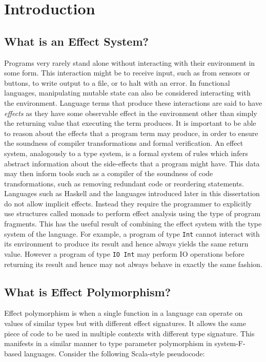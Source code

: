 
\chapter{Introduction}


\section{What is an Effect System?}

Programs very rarely stand alone without interacting with their environment in some form. This interaction might be to receive input, such as from sensors or buttons, to write output to a file, or to halt with an error. In functional languages, manipulating mutable state can also be considered interacting with the environment. Language terms that produce these interactions are said to have \textit{effects} as they have some observable effect in the environment other than simply the returning value that executing the term produces. It is important to be able to reason about the effects that a program term may produce, in order to ensure the soundness of compiler transformations and formal verification. An effect system, analogously to a type system, is a formal system of rules which infers abstract information about the side-effects that a program might have. This data may then inform tools such as a compiler of the soundness of code transformations, such as removing redundant code or reordering statements. Languages such as Haskell and the languages introduced later in this dissertation do not allow implicit effects. Instead they require the programmer to explicitly use structures called monads \cite{MoggiMonads} to perform effect analysis using the type of program fragments. This has the useful result of combining the effect system with the type system of the language. For example, a program of type \texttt{Int} cannot interact with its environment to produce its result and hence always yields the same return value. However a program of type \texttt{IO Int} may perform IO operations before returning its result and hence may not always behave in exactly the same fashion.

\section{What is Effect Polymorphism?}


Effect polymorphism is when a single function in a language can operate on values of similar types but with different effect signatures. It allows the same piece of code to be used in multiple contexts with different type signature. This manifests in a similar manner to type parameter polymorphism in system-F-based languages. Consider the following Scala-style pseudocode:
\renewcommand\o[1]{\textcolor{orange}{#1}}
\newcommand\bl[1]{\textcolor{blue}{#1}}
\newcommand\gr[1]{\textcolor{DarkGreen}{#1}}
\newcommand\pl[1]{\textcolor{purple}{#1}}
\newcommand\cy[1]{\textcolor{cyan}{#1}}
\newcommand\red[1]{\textcolor{red}{#1}}

